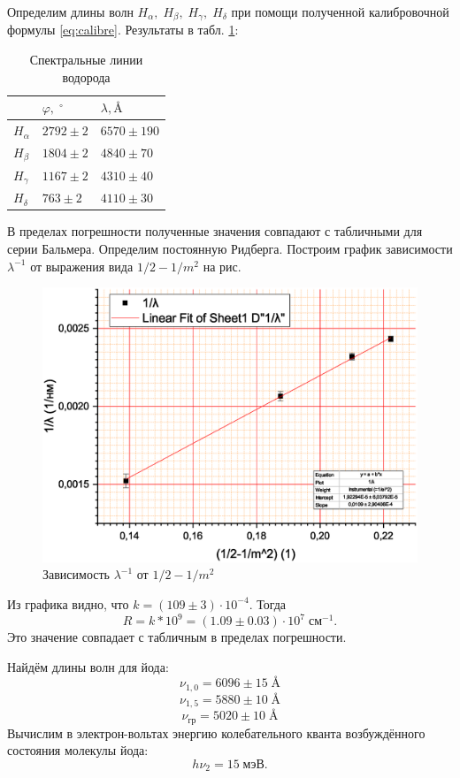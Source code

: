 \documentclass[a4paper]{article}
\renewcommand{\phi}{\varphi}
\newcommand{\angstrom}{\text{\AA}}
\begin{document}
	Определим длины волн $H_\alpha,\;H_\beta,\;H_\gamma,\;H_\delta $ при помощи полученной калибровочной формулы \eqref{eq:calibre}. Результаты в табл. \ref{tab:H}:
	\begin{table}[h]
		\centering
		\begin{tabular}{|l|l|l|}
			\hline
			& $\phi, \;^\circ$ & $\lambda, \angstrom$ \\ \hline
			$ H_\alpha$ & $2792\pm 2$      & $6570\pm 190$        \\ \hline
			$H_\beta$   & $1804\pm 2$      & $4840\pm 70$         \\ \hline
			$H_\gamma$  & $1167\pm 2$      & $4310\pm 40$         \\ \hline
			$H_\delta$  & $763\pm 2$       & $4110\pm 30$         \\ \hline
		\end{tabular}
		\caption{Спектральные линии водорода}
		\label{tab:H}
	\end{table}
	В пределах погрешности полученные значения совпадают с табличными для серии Бальмера. Определим постоянную Ридберга. Построим график зависимости $ \lambda^{-1} $ от выражения вида $ 1/2 - 1/m^2 $ на рис.
	\begin{figure}
		\centering
		\includegraphics[width=0.7\linewidth]{Graph3}
		\caption{Зависимость $ \lambda^{-1} $ от $ 1/2 - 1/m^2 $}
		\label{fig:graph3}
	\end{figure}
	Из графика видно, что $ k = (109\pm 3)\cdot 10^{-4} $. Тогда
	\[R = k*10^9 = (1.09\pm 0.03)\cdot 10^7\; см^{-1}.\] Это значение совпадает с табличным в пределах погрешности.
	
	Найдём длины волн для йода:
	\[\nu_{1, 0} = 6096\pm 15\; \angstrom\]
	\[\nu_{1, 5} = 5880\pm 10 \;\angstrom\]
	\[\nu_{гр} = 5020\pm 10 \;\angstrom\]
	Вычислим в электрон-вольтах энергию колебательного кванта возбуждённого состояния молекулы йода:
	\[h\nu_2 = 15 \;мэВ.\]
	
\end{document}
